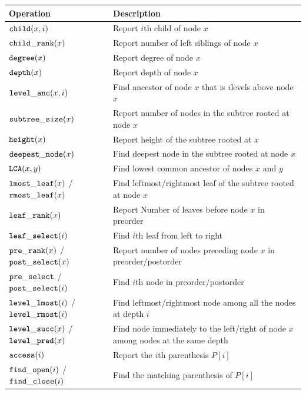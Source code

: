 \begin{table}[t]
\begin{center}
\begin{tabular}{|>{\raggedright}p{2.4cm}|>{\raggedright\arraybackslash}p{5.2cm}|} \hline
\bf Operation                         & \bf Description        \\ \hline
$\mathtt{child}(x,i)$                         & Report $i$th child of node $x$\\
$\mathtt{child\_rank}(x)$                       & Report number of left siblings of node $x$\\
$\mathtt{degree}(x)$                          & Report degree of node $x$\\
$\mathtt{depth}(x)$                           & Report depth of node $x$\\
$\mathtt{level\_anc}(x,i)$                      & Find ancestor of node $x$ that is $i $levels above node $x$ \\
$\mathtt{subtree\_size}(x)$                     & Report number of nodes in the subtree rooted at node $x$ \\
$\mathtt{height}(x)$                          & Report height of the subtree rooted at $x$ \\
$\mathtt{deepest\_node}(x)$                     & Find deepest node in the subtree rooted at node $x$\\
$\mathtt{LCA}(x,y)$                           & Find lowest common ancestor of nodes $x$ and $y$ \\
$\mathtt{lmost\_leaf}(x)$ /$\mathtt{rmost\_leaf}(x)$      & Find leftmost/rightmost leaf of the subtree rooted at node $x$\\
$\mathtt{leaf\_rank}(x)$                        & Report Number of leaves before node $x$ in preorder\\
$\mathtt{leaf\_select}(i)$                      & Find $i$th leaf from left to right\\
$\mathtt{pre\_rank}(x)$ /$\mathtt{post\_select}(x)$         & Report number of nodes preceding node $x$ in preorder/postorder\\
$\mathtt{pre\_select}$ /$\mathtt{post\_select}(i)$        & Find $i$th node in preorder/postorder\\       
$\mathtt{level\_lmost}(i)$ /$\mathtt{level\_rmost}(i)$    & Find leftmost/rightmost node among all the nodes at depth $i$ \\
$\mathtt{level\_succ}(x)$ /$\mathtt{level\_pred}(x)$      & Find node immediately to the left/right of node $x$ among nodes at the same depth\\ \hline
$\mathtt{access}(i)$                          & Report the $i$th parenthesis $P[i]$        \\ 
$\mathtt{find\_open}(i)$ /$\mathtt{find\_close}(i)$       & Find the matching parenthesis of $P[i]$ \\

\end{tabular}
\end{center}
\end{table}
